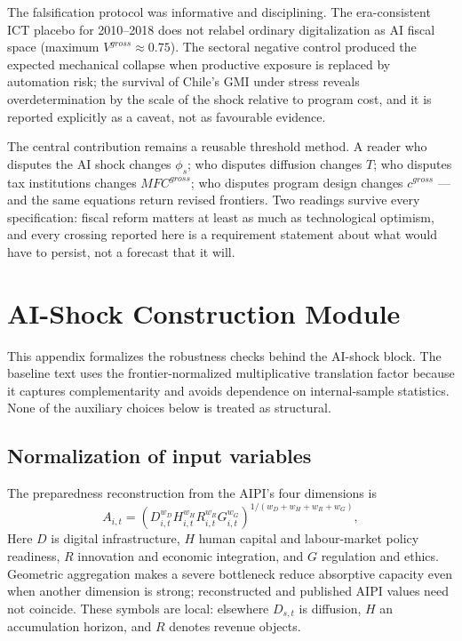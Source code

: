 \documentclass[11pt,a4paper]{article}
\begin{document}
The falsification protocol was informative and disciplining. The era-consistent ICT placebo for 2010--2018 does not relabel ordinary digitalization as AI fiscal space (maximum $V^{gross}\approx0.75$). The sectoral negative control produced the expected mechanical collapse when productive exposure is replaced by automation risk; the survival of Chile's GMI under stress reveals overdetermination by the scale of the shock relative to program cost, and it is reported explicitly as a caveat, not as favourable evidence.

The central contribution remains a reusable threshold method. A reader who disputes the AI shock changes $\phi_s$; who disputes diffusion changes $T$; who disputes tax institutions changes $MFC^{gross}$; who disputes program design changes $c^{gross}$ --- and the same equations return revised frontiers. Two readings survive every specification: fiscal reform matters at least as much as technological optimism, and every crossing reported here is a requirement statement about what would have to persist, not a forecast that it will.



\appendix
\section{AI-Shock Construction Module}\label{app:ai_shock_module}

This appendix formalizes the robustness checks behind the AI-shock block. The baseline text uses the frontier-normalized multiplicative translation factor because it captures complementarity and avoids dependence on internal-sample statistics. None of the auxiliary choices below is treated as structural.

\subsection{Normalization of input variables}

The preparedness reconstruction from the AIPI's four dimensions is
\begin{equation}
    A_{i,t}=\left(D_{i,t}^{w_D}H_{i,t}^{w_H}R_{i,t}^{w_R}G_{i,t}^{w_G}\right)^{1/(w_D+w_H+w_R+w_G)},
\end{equation}
Here $D$ is digital infrastructure, $H$ human capital and labour-market policy readiness, $R$ innovation and economic integration, and $G$ regulation and ethics. Geometric aggregation makes a severe bottleneck reduce absorptive capacity even when another dimension is strong; reconstructed and published AIPI values need not coincide. These symbols are local: elsewhere $D_{s,t}$ is diffusion, $H$ an accumulation horizon, and $R$ denotes revenue objects.
\end{document}
